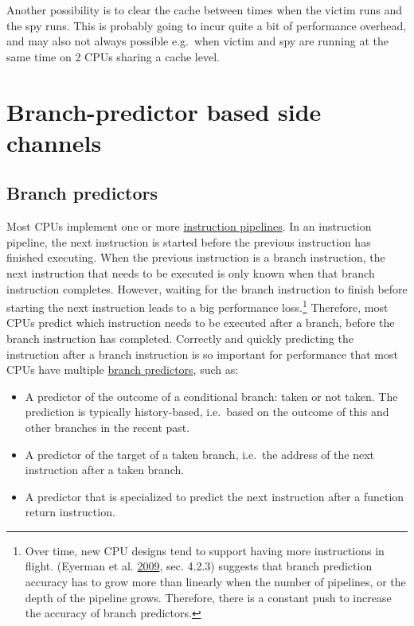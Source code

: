 \documentclass[a4paper,]{report}
\providecommand{\tightlist}{%
  \setlength{\itemsep}{0pt}\setlength{\parskip}{0pt}}
\begin{document}
Another possibility is to clear the cache between times when the victim
runs and the spy runs. This is probably going to incur quite a bit of
performance overhead, and may also not always possible e.g.~when victim
and spy are running at the same time on 2 CPUs sharing a cache level.

\hypertarget{branch-predictor-based-side-channels}{%
\section{Branch-predictor based side
channels}\label{branch-predictor-based-side-channels}}

\hypertarget{branch-predictors}{%
\subsection{Branch predictors}\label{branch-predictors}}

Most CPUs implement one or more
\href{https://en.wikipedia.org/wiki/Instruction_pipelining}{instruction
pipelines}.  In an
instruction pipeline, the next instruction is started before the
previous instruction has finished executing. When the previous
instruction is a branch instruction, the next instruction that needs to
be executed is only known when that branch instruction completes.
However, waiting for the branch instruction to finish before starting
the next instruction leads to a big performance loss.\footnote{Over
  time, new CPU designs tend to support having more instructions in
  flight. (Eyerman et al. \protect\hyperlink{ref-Eyerman2009}{2009},
  sec. 4.2.3) suggests that branch prediction accuracy has to grow more
  than linearly when the number of pipelines, or the depth of the
  pipeline grows. Therefore, there is a constant push to increase the
  accuracy of branch predictors.} Therefore, most CPUs
predict which instruction needs to be executed after a
branch, before the branch instruction has completed. Correctly and
quickly predicting the instruction after a branch instruction is so
important for performance that most CPUs have multiple
\href{https://en.wikipedia.org/wiki/Branch_predictor}{branch
predictors}, such as:

\begin{itemize}
\tightlist
\item
  A predictor of the outcome of a conditional
  branch: taken or not taken. The
  prediction is typically history-based,
  i.e.~based on the outcome of this and other branches in the recent
  past.
\item
  A predictor of the target of a taken
  branch, i.e.~the address of the next
  instruction after a taken branch.
\item
  A predictor that is specialized to predict the next instruction after
  a function return instruction.
\end{itemize}
\end{document}
